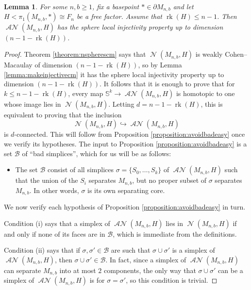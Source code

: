 \documentclass[11pt]{amsart}
\numberwithin{equation}{section}
\theoremstyle{plain}
\newtheorem{lemma}[theorem]{Lemma}
\theoremstyle{definition}
\theoremstyle{remark}
\DeclareMathOperator{\rank}{rk}
\newcommand\cB{\ensuremath{\mathcal{B}}}
\newcommand\bbS{\ensuremath{\mathbb{S}}}
\DeclareMathOperator{\NSpheres}{\mathcal{N}}
\DeclareMathOperator{\ANSpheres}{\mathcal{AN}}
\begin{document}
\begin{lemma}
\label{lemma:augsphere}
For some $n,b \geq 1$, fix a basepoint $\ast \in \partial M_{n,b}$
and let $H < \pi_1(M_{n,b},\ast) \cong F_n$ be a free factor.  Assume
that $\rank(H) \leq n-1$.
Then $\ANSpheres(M_{n,b},H)$ has
the sphere local injectivity property up to dimension $(n-1-\rank(H))$.
\end{lemma}
\begin{proof}
Theorem \ref{theorem:nspherescm} says that $\NSpheres(M_{n,b},H)$ is weakly Cohen--Macaulay of dimension
$(n-1-\rank(H))$, so by Lemma \ref{lemma:makeinjectivecm} it has the sphere local injectivity
property up to dimension $(n-1-\rank(H))$.  It follows that it is enough to prove that
for $k \leq n-1-\rank(H)$, every map $\bbS^k \rightarrow \ANSpheres(M_{n,b},H)$ is
homotopic to one whose image lies in $\NSpheres(M_{n,b},H)$.  Letting $d = n-1-\rank(H)$, this
is equivalent to proving that the inclusion
\[\NSpheres(M_{n,b},H) \hookrightarrow \ANSpheres(M_{n,b},H)\]
is $d$-connected.
This will follow from Proposition \ref{proposition:avoidbadeasy}
once we verify its hypotheses.
The input to Proposition \ref{proposition:avoidbadeasy} is a set $\cB$ of ``bad simplices'', which
for us will be as follows:
\begin{itemize}
\item The set $\cB$ consist of all simplices $\sigma = \{S_0,\ldots,S_k\}$ of $\ANSpheres(M_{n,b},H)$
such that the union of the $S_i$ separates $M_{n,b}$, but no proper subset
of $\sigma$ separates $M_{n,b}$.  In other words, $\sigma$ is its own separating core.
\end{itemize}
We now verify each hypothesis of Proposition \ref{proposition:avoidbadeasy} in turn.

Condition (i) says that a simplex of $\ANSpheres(M_{n,b},H)$ lies in $\NSpheres(M_{n,b},H)$ if
and only if none of its faces are in $\cB$, which is immediate from the definitions.

Condition (ii) says that if $\sigma,\sigma' \in \cB$ are such that $\sigma \cup \sigma'$ is a simplex
of $\ANSpheres(M_{n,b},H)$, then $\sigma \cup \sigma' \in \cB$.  In fact, since a simplex of
$\ANSpheres(M_{n,b},H)$ can separate $M_{n,b}$ into at most $2$ components, the only way
that $\sigma \cup \sigma'$ can be a simplex of $\ANSpheres(M_{n,b},H)$ is for $\sigma = \sigma'$,
so this condition is trivial.


\end{proof}
\end{document}
